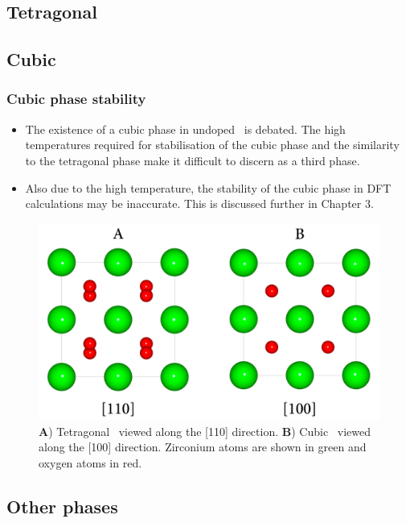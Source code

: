 \subsection{Tetragonal}

\subsection{Cubic}

\subsubsection{Cubic phase stability}

\begin{itemize}
\item The existence of a cubic phase in undoped \zirconia\ is debated. The high temperatures required for stabilisation of the cubic phase and the similarity to the tetragonal phase make it difficult to discern as a third phase.
\item Also due to the high temperature, the stability of the cubic phase in DFT calculations may be inaccurate. This is discussed further in Chapter 3.
\end{itemize}

\begin{figure}[htp]
\centering
\includegraphics[width=\linewidth]{images/tet_vs_cubic.png}
\caption{\textbf{A}) Tetragonal \zirconia\ viewed along the [110] direction. \textbf{B}) Cubic \zirconia\ viewed along the [100] direction. Zirconium atoms are shown in green and oxygen atoms in red.}
\label{figure:tetvscubic}
\end{figure}

\subsection{Other phases}

